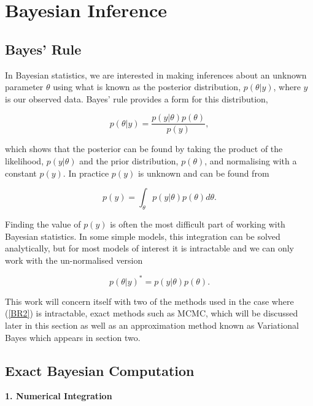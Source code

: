 \documentclass{article}\usepackage[]{graphicx}\usepackage[]{color}
\numberwithin{equation}{section}
\begin{document}
\tableofcontents

\section{Bayesian Inference}

\subsection{Bayes' Rule}

In Bayesian statistics, we are interested in making inferences about an unknown parameter $\theta$ using what is known as the posterior distribution, $p(\theta | y)$, where $y$ is our observed data. Bayes' rule provides a form for this distribution, 

\begin{equation}
\label{BR1}
p(\theta | y) = \frac{p(y | \theta) p(\theta)}{p(y)},
\end{equation}

which shows that the posterior can be found by taking the product of the likelihood, $p(y | \theta)$ and the prior distribution, $p(\theta)$, and normalising with a constant $p(y)$. In practice $p(y)$ is unknown and can be found from 

\begin{equation}
\label{BR2}
p(y) = \int_\theta p(y | \theta) p(\theta) d \theta.
\end{equation}

Finding the value of $p(y)$ is often the most difficult part of working with Bayesian statistics. In some simple models, this integration can be solved analytically, but for most models of interest it is intractable and we can only work with the un-normalised version

\begin{equation}
\label{BR3}
p(\theta | y)^* = p(y | \theta) p(\theta).
\end{equation}

This work will concern itself with two of the methods used in the case where (\ref{BR2}) is intractable, exact methods such as MCMC, which will be discussed later in this section as well as an approximation method known as Variational Bayes which appears in section two.

\subsection{Exact Bayesian Computation}

\textbf{1. Numerical Integration}\newline
\end{document}
